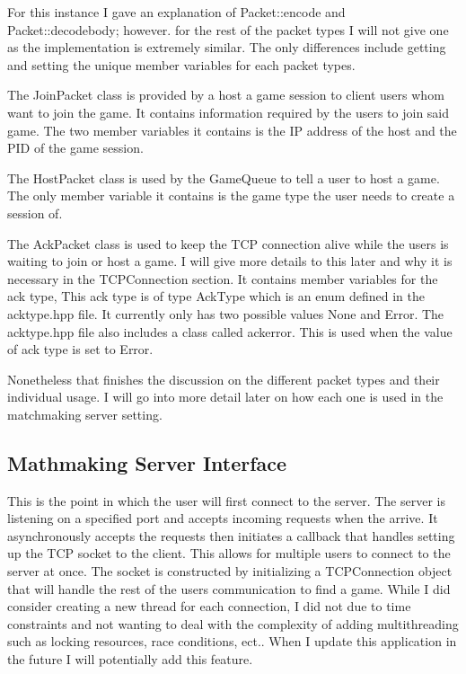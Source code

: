 \documentclass[conference]{IEEEtran}
\begin{document}
For this instance I gave an explanation of Packet::encode and Packet::decode\textunderscore body; however. for the rest of the packet types I will not give one as the implementation is extremely similar.
The only differences include getting and setting the unique member variables for each packet types.


The JoinPacket class is provided by a host a game session to client users whom want to join the game. 
It contains information required by the users to join said game.
The two member variables it contains is the IP address of the host and the PID of the game session.

The HostPacket class is used by the GameQueue to tell a user to host a game.
The only member variable it contains is the game type the user needs to create a session of.

The AckPacket class is used to keep the TCP connection alive while the users is waiting to join or host a game.
I will give more details to this later and why it is necessary in the TCPConnection section.
It contains member variables for the ack type,
This ack type is of type AckType which is an enum defined in the ack\textunderscore type.hpp file.
It currently only has two possible values None and Error.
The ack\textunderscore type.hpp file also includes a class called ack\textunderscore error.
This is used when the value of ack type is set to Error.

Nonetheless that finishes the discussion on the different packet types and their individual usage.
I will go into more detail later on how each one is used in the matchmaking server setting.


\subsection{Mathmaking Server Interface}
This is the point in which the user will first connect to the server.
The server is listening on a specified port and accepts incoming requests when the arrive. 
It asynchronously accepts the requests then initiates a callback that handles setting up the TCP socket to the client.
This allows for multiple users to connect to the server at once. 
The socket is constructed by initializing a TCPConnection object that will handle the rest of the users communication to find a game.
While I did consider creating a new thread for each connection, I did not due to time constraints and not wanting to deal with the complexity of adding multithreading such as locking resources, race conditions, ect..
When I update this application in the future I will potentially add this feature.
\end{document}
